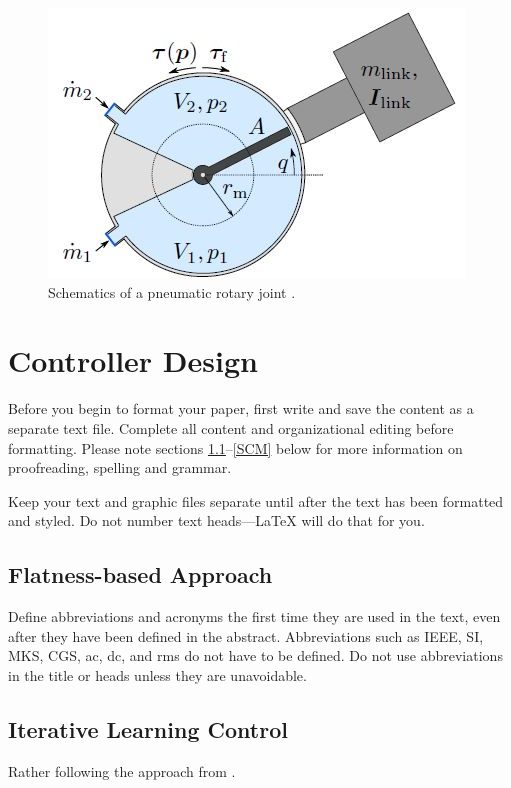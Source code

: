 \documentclass[conference]{IEEEtran}
\begin{document}
\begin{figure}[htbp]
\centerline{\includegraphics[width=\columnwidth]{./pictures/pJoint.jpg}}
\caption{Schematics of a pneumatic rotary joint \cite{HoffmannIFAC23}.}
\label{fig:pJointScheme}
\end{figure}

\section{Controller Design}
Before you begin to format your paper, first write and save the content as a 
separate text file. Complete all content and organizational editing before 
formatting. Please note sections \ref{AA}--\ref{SCM} below for more information on 
proofreading, spelling and grammar.

Keep your text and graphic files separate until after the text has been 
formatted and styled. Do not number text heads---{\LaTeX} will do that 
for you.

\subsection{Flatness-based Approach}\label{AA}
Define abbreviations and acronyms the first time they are used in the text, 
even after they have been defined in the abstract. Abbreviations such as 
IEEE, SI, MKS, CGS, ac, dc, and rms do not have to be defined. Do not use 
abbreviations in the title or heads unless they are unavoidable.

\subsection{Iterative Learning Control}
Rather following the approach from \cite{ILCGlueck2015}.
\end{document}
